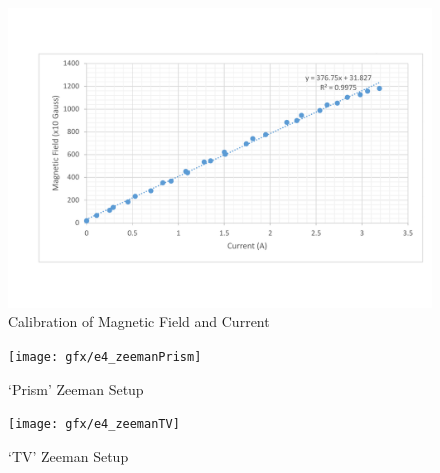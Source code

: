 \begin{figure}[bth]
	\begin{center}
		\includegraphics[width=1.3\linewidth]{gfx/4_zeemanCalibration}
	\end{center}
\caption[Calibration of Magnetic Field and Current]{Calibration of Magnetic Field and Current}
\label{e4z2}
\end{figure}

\begin{figure}[bth]
	\begin{center}
		\texttt{[image: gfx/e4\_zeemanPrism]}
	\end{center}
\caption[`Prism' Zeeman Setup]{`Prism' Zeeman Setup}
\label{e4prism}
\end{figure}

\begin{figure}[bth]
	\begin{center}
		\texttt{[image: gfx/e4\_zeemanTV]}
	\end{center}
\caption[`TV' Zeeman Setup]{`TV' Zeeman Setup}
\label{e4tv}
\end{figure}